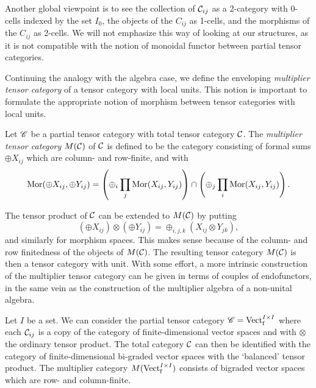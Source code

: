 \begin{Rem} Another global viewpoint is to see the collection of $\mathcal{C}_{ij}$ as a 2-category with 0-cells indexed by the set $I_0$, the objects of the $C_{ij}$ as 1-cells, and  the morphisms of the $C_{ij}$ as 2-cells. We will not emphasize this way of looking at our structures, as it is not compatible with the notion of monoidal functor between partial tensor categories.
\end{Rem} 

Continuing the analogy with the algebra case, we define the enveloping \emph{multiplier tensor category} of a tensor category with local units. This notion is important to formulate the appropriate notion of morphism between tensor categories with local units. 

\begin{Def} Let $\mathscr{C}$ be a partial tensor category with total tensor category $\mathcal{C}$. The \emph{multiplier tensor category} $M(\mathcal{C})$ of $\mathcal{C}$ is defined to be the category consisting of formal sums $\oplus X_{ij}$ which are column- and row-finite, and with \[\mathrm{Mor}(\oplus X_{ij},\oplus Y_{ij}) = \left(\oplus_i \prod_j \mathrm{Mor}(X_{ij},Y_{ij}) \right) \cap \left(\oplus_j\prod_i \mathrm{Mor}(X_{ij},Y_{ij})\right).\]
\end{Def}

The tensor product of $\mathcal{C}$ can be extended to $M(\mathcal{C})$ by putting \[\left(\oplus X_{ij}\right)\otimes \left(\oplus Y_{ij}\right) = \oplus_{i,j,k} \left(X_{ij}\otimes Y_{jk}\right),\] and similarly for morphism spaces. This makes sense because of the column- and row finitedness of the objects of $M(\mathcal{C})$. The resulting tensor category $M(\mathcal{C})$ is then a tensor category with unit. With some effort, a more intrinsic construction of the multiplier tensor category can be given in terms of couples of endofunctors, in the same vein as the construction of the multiplier algebra of a non-unital algebra. 

\begin{Exa} Let $I$ be a set. We can consider the partial tensor category $\mathscr{C} = \mathrm{Vect}^{I\times I}_{\operatorname{\mathrm{f}}}$ where each $\mathcal{C}_{ij}$ is a copy of the category of finite-dimensional vector spaces and with $\otimes$ the ordinary tensor product. The total category $\mathcal{C}$ can then be identified with the category of finite-dimensional bi-graded vector spaces with the `balanced' tensor product. The multiplier category $M(\mathrm{Vect}^{I\times I}_{\operatorname{\mathrm{f}}})$ consists of bigraded vector spaces which are row- and column-finite.
\end{Exa}

